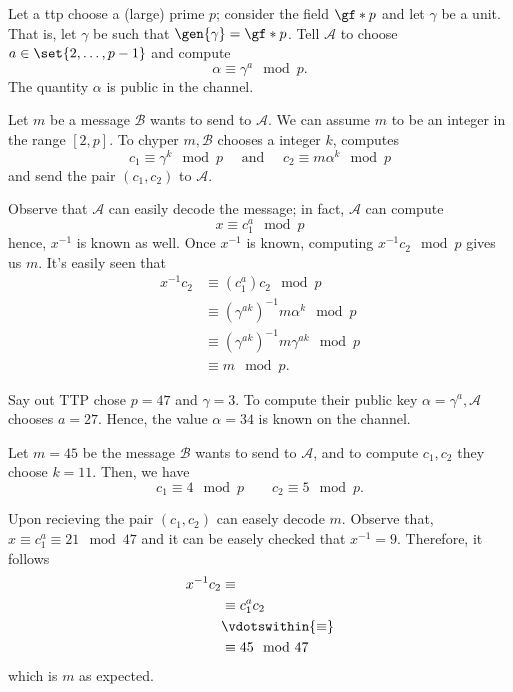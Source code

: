 \documentclass{subfiles}
\begin{document}
    Let a \gls{ttp} choose a (large) prime \(p\); consider the field \(\gf*{p}\) and 
        let \(\gamma\) be a unit. That is, let \(\gamma\) be such that \(\gen{\gamma} = \gf*{p}\).
        Tell \(\mathcal{A}\) to choose \(a \in \set{2, \ldots, p - 1}\) and compute 
        \[
            \alpha \equiv \gamma^{a} \mod{p}.
        \]
        The quantity \(\alpha\) is public in the channel.
    
    Let \(m\) be a message \(\mathcal{B}\) wants to send to \(\mathcal{A}\). 
        We can assume \(m\) to be an integer in the range \([2, p]\).
        To chyper \(m, \mathcal{B}\) chooses a integer \(k\), computes 
        \[
            c_{1} \equiv \gamma^{k} \mod{p} \quad 
                \text{ and } \quad c_{2} \equiv m\alpha^{k} \mod{p}
        \]
        and send the pair \((c_{1}, c_{2})\) to \(\mathcal{A}\).

    Observe that \(\mathcal{A}\) can easily decode the message; in fact, \(\mathcal{A}\)
        can compute 
        \[
            x \equiv c_{1}^{a} \mod{p}
        \]
        hence, \(x^{-1}\) is known as well. Once \(x^{-1}\) is known, computing 
        \(x^{-1}c_{2} \mod{p}\) gives us \(m\). It's easily seen that  
        \[\begin{aligned}
            x^{-1}c_{2} &\equiv (c_{1}^{a})c_{2} \mod{p} \\
                & \equiv (\gamma^{ak})^{-1}m\alpha^{k} \mod{p} \\ 
                & \equiv (\gamma^{ak})^{-1}m \gamma^{ak} \mod{p} \\ 
                & \equiv m \mod {p}.
        \end{aligned}\]

    \begin{example*}
        Say out TTP chose \(p = 47\) and \(\gamma = 3\). 
            To compute their public key \(\alpha =  \gamma^{a}, \mathcal{A}\) 
            chooses \(a = 27\). Hence, the value \(\alpha = 34\) is known on the channel.

        Let \(m = 45\) be the message \(\mathcal{B}\) wants to send to \(\mathcal{A}\),
            and to compute \(c_{1}, c_{2}\) they choose \(k = 11\). Then, we have 
            \[
                c_{1} \equiv 4 \mod{p} \qquad c_{2} \equiv 5 \mod{p}.
            \]

        Upon recieving the pair \((c_{1}, c_{2})\) can easely decode \(m\). 
            Observe that, \(x \equiv c_{1}^{a} \equiv 21 \mod{47}\) and 
            it can be easely checked that \(x^{-1} = 9\). 
            Therefore, it follows
            \[\begin{aligned}
                x^{-1}c_{2} & \equiv \\
                    & \equiv c_{1}^{a}c_{2} \\ 
                    & \vdotswithin{\equiv} \\ 
                    & \equiv 45 \mod{47}
            \end{aligned}\]
            which is \(m\) as expected.
    \end{example*}
\end{document}
